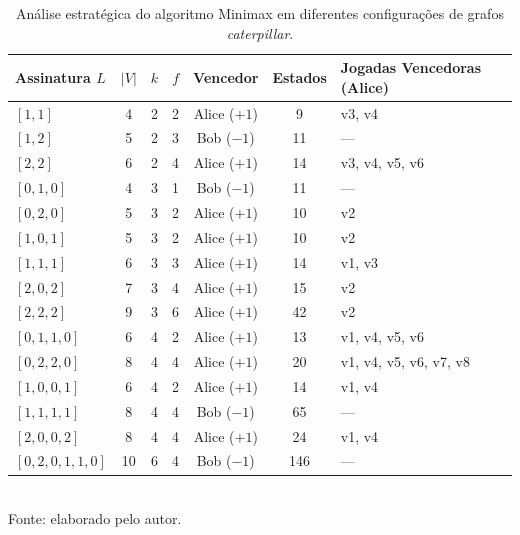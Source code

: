 \begin{table}[htb]
\centering
\caption{Análise estratégica do algoritmo Minimax em diferentes configurações de grafos \textit{caterpillar}.}
\label{tab:resultados_caterpillar_classes}
\begin{tabular}{lcccccp{3.8cm}}
\toprule
\textbf{Assinatura $L$} & $|V|$ & $k$ & $f$ & \textbf{Vencedor} & \textbf{ Estados } & \textbf{Jogadas Vencedoras (Alice)} \\
\midrule
$[1, 1]$ & 4 & 2 & 2 & Alice ($+1$) & 9 & v3, v4 \\
$[1, 2]$ & 5 & 2 & 3 & Bob ($-1$) & 11 & --- \\
$[2, 2]$ & 6 & 2 & 4 & Alice ($+1$) & 14 & v3, v4, v5, v6 \\
$[0, 1, 0]$ & 4 & 3 & 1 & Bob ($-1$) & 11 & --- \\
$[0, 2, 0]$ & 5 & 3 & 2 & Alice ($+1$) & 10 & v2 \\
$[1, 0, 1]$ & 5 & 3 & 2 & Alice ($+1$) & 10 & v2 \\
$[1, 1, 1]$ & 6 & 3 & 3 & Alice ($+1$) & 14 & v1, v3 \\
$[2, 0, 2]$ & 7 & 3 & 4 & Alice ($+1$) & 15 & v2 \\
$[2, 2, 2]$ & 9 & 3 & 6 & Alice ($+1$) & 42 & v2 \\
$[0, 1, 1, 0]$ & 6 & 4 & 2 & Alice ($+1$) & 13 & v1, v4, v5, v6 \\
$[0, 2, 2, 0]$ & 8 & 4 & 4 & Alice ($+1$) & 20 & v1, v4, v5, v6, v7, v8 \\
$[1, 0, 0, 1]$ & 6 & 4 & 2 & Alice ($+1$) & 14 & v1, v4 \\
$[1, 1, 1, 1]$ & 8 & 4 & 4 & Bob ($-1$) & 65 & --- \\
$[2, 0, 0, 2]$ & 8 & 4 & 4 & Alice ($+1$) & 24 & v1, v4 \\
$[0, 2, 0, 1, 1, 0]$ & 10 & 6 & 4 & Bob ($-1$) & 146 & --- \\
\bottomrule
\end{tabular}
\\ \footnotesize{Fonte: elaborado pelo autor.}
\end{table}

